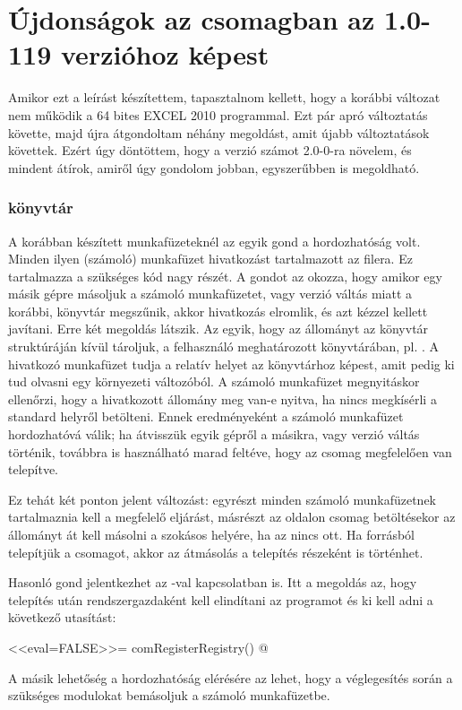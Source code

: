 \chapter{Újdonságok az  csomagban az 1.0-119
verzióhoz képest}\label{chap:10}


Amikor ezt a leírást készítettem, tapasztalnom kellett, hogy a korábbi
változat nem működik a 64 bites EXCEL 2010 programmal. Ezt pár apró
változtatás követte, majd újra átgondoltam néhány megoldást, amit
újabb változtatások követtek. Ezért úgy döntöttem, hogy a verzió
számot 2.0-0-ra növelem, és mindent átírok, amiről úgy gondolom
jobban, egyszerűbben is megoldható.

\subsection{ könyvtár}

A korábban készített munkafüzeteknél az egyik gond a hordozhatóság
volt. Minden ilyen (számoló) munkafüzet hivatkozást tartalmazott az
 filera. Ez tartalmazza a szükséges  kód nagy
részét. A gondot az okozza, hogy amikor egy másik gépre másoljuk a 
számoló munkafüzetet, vagy verzió váltás miatt a korábbi, 
könyvtár megszűnik, akkor hivatkozás elromlik, és azt kézzel kellett javítani.
Erre két megoldás látszik. Az egyik, hogy az  állományt az 
könyvtár struktúráján kívül tároljuk, a felhasználó meghatározott
könyvtárában, pl. . A 
hivatkozó munkafüzet tudja a relatív helyet az  könyvtárhoz
képest, amit pedig ki tud olvasni egy környezeti változóból. A számoló
munkafüzet megnyitáskor ellenőrzi, hogy a hivatkozott 
állomány meg van-e nyitva, ha nincs megkísérli a standard helyről 
betölteni. Ennek eredményeként a számoló munkafüzet hordozhatóvá
válik; ha átvisszük 
egyik gépről a másikra, vagy verzió váltás történik, továbbra is
használható marad feltéve, 
hogy az  csomag megfelelően van telepítve.

Ez tehát két ponton jelent változást: egyrészt minden számoló
munkafüzetnek tartalmaznia kell a megfelelő  
eljárást, másrészt az  oldalon  csomag betöltésekor 
az  állományt át kell másolni a szokásos helyére, ha az
nincs ott. Ha forrásból telepítjük 
a csomagot, akkor az átmásolás a telepítés részeként is történhet.

Hasonló gond jelentkezhet az -val
kapcsolatban is. Itt a megoldás az, hogy telepítés után
rendszergazdaként kell elindítani az  programot és ki kell adni a 
következő utasítást:
\begin{Rnw}
<<eval=FALSE>>=
comRegisterRegistry()
@
\end{Rnw}
A másik lehetőség a hordozhatóság elérésére az lehet, hogy a
véglegesítés során a szükséges modulokat bemásoljuk a számoló munkafüzetbe.

